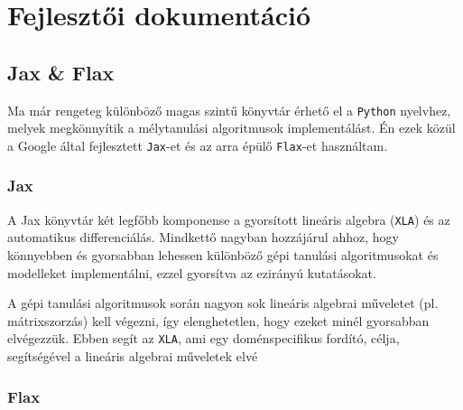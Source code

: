 \chapter{Fejlesztői dokumentáció}
\label{ch:impl}

\section{Jax & Flax}
Ma már rengeteg különböző magas szintű könyvtár érhető el a \texttt{Python} nyelvhez, melyek megkönnyítik a mélytanulási algoritmusok implementálást. Én ezek közül a Google által fejlesztett \texttt{Jax}-et\cite{jax2018github} és az arra épülő \texttt{Flax}-et\cite{flax2020github} használtam.

\subsection{Jax}
A Jax könyvtár két legfőbb komponense a gyorsított lineáris algebra (\texttt{XLA}) és az automatikus differenciálás. Mindkettő nagyban hozzájárul ahhoz, hogy könnyebben és gyorsabban lehessen különböző gépi tanulási algoritmusokat és modelleket implementálni, ezzel gyorsítva az ezirányú kutatásokat.

A gépi tanulási algoritmusok során nagyon sok lineáris algebrai műveletet (pl. mátrixszorzás) kell végezni, így elenghetetlen, hogy ezeket minél gyorsabban elvégezzük. Ebben segít az \texttt{XLA}, ami egy doménspecifikus fordító, célja, segítségével a lineáris algebrai műveletek elvé 

\subsection{Flax}

\cite{palmtree}